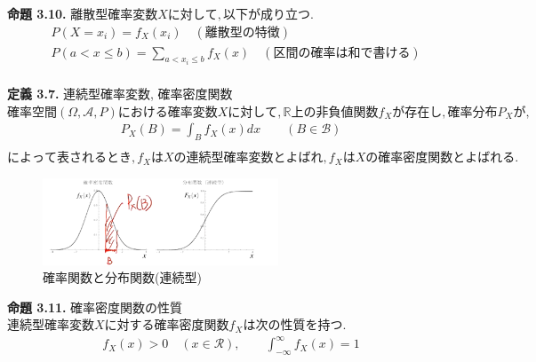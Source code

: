 \documentclass[dvipdfmx,10pt, a4j]{jarticle}
\theoremstyle{definition}
\begin{document}
    \noindent
    \textbf{命題 3.10.} $離散型確率変数 X に対して, 以下が成り立つ.$\\
    \begin{align*}
        &P(X = x_i) = f_X(x_i) \quad (離散型の特徴)\\
        &P(a < x \leq b) = \sum_{a < x_i \leq b}{f_X(x)} \quad (区間の確率は和で書ける)\\
    \end{align*}
    
    \noindent
    \textbf{定義 3.7.} 連続型確率変数, 確率密度関数\\
    $確率空間 (\Omega, \mathcal{A}, P) における確率変数 X に対して, \mathbb{R} 上の非負値関数 f_X が存在し, 確率分布 P_Xが,$\\
    \begin{align*}
        P_X(B) = \int_{B}{f_X(x)}dx \qquad (B \in \mathcal{B})\\
    \end{align*}
    $によって表されるとき, f_X は X の \textbf{連続型確率変数} とよばれ, f_X は X の \textbf{確率密度関数} とよばれる.$\\
    \begin{figure}[htbp]
        \begin{center}
            \includegraphics[width=7.0cm]{D_6/img_4.png}
            \caption{確率関数と分布関数(連続型)}
        \end{center}
    \end{figure}
    
    \noindent
    \textbf{命題 3.11.} 確率密度関数の性質\\
    $連続型確率変数 X に対する確率密度関数 f_X は次の性質を持つ.$\\
    \begin{align*}
        f_X(x) > 0 \quad (x \in \mathcal{R}), \qquad \int_{- \infty}^{\infty}{f_X(x)} = 1\\ 
    \end{align*}
    
\end{document}
